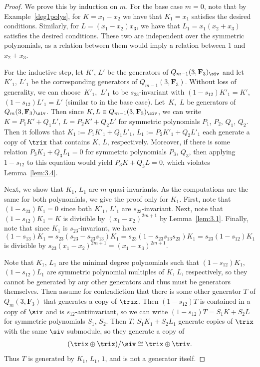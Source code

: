  \begin{proof}
 We prove this by induction on $m$. For the base case $m=0$, note that by Example~\ref{deg1polys}, for ${K=x_1-x_2}$ we have that $K_1=x_1$ satisfies the desired conditions. Similarly, for $L=(x_1-x_2)x_3$, we have that $L_1=x_1(x_2+x_3)$ satisfies the desired conditions. These two are independent over the symmetric polynomials, as a relation between them would imply a relation between 1 and~${x_2+x_3}$.

 For the inductive step, let $K'$, $L'$ be the generators of $Q_{m-1}(3,\mathbf{F}_3)_\siv$ and let $K'_1$, $L'_1$ be the corresponding generators of $Q_{m-1}(3,\mathbf{F}_3)$. Without loss of generality, we can choose~$K'_1$,~$L'_1$ to be $s_{23}$-invariant with $(1-s_{12})K'_1=K'$, $(1-s_{12})L'_1=L'$ (similar to in the base case). Let~$K$,~$L$ be generators of $Q_m(3,\mathbf{F}_3)_\siv$. Then since $K,L\in Q_{m-1}(3,\mathbf{F}_3)_\siv$, we can write $K=P_1K'+Q_1L'$, $L=P_2K'+Q_2L'$ for symmetric polynomials $P_1$, $P_2$, $Q_1$, $Q_2$. Then it follows that $K_1:=P_1K'_1+Q_1L'_1$, $L_1:=P_2K'_1+Q_2L'_1$ each generate a copy of $\trix$ that contains $K$, $L$, respectively. Moreover, if there is some relation $P_3K_1+Q_3L_1=0$ for symmetric polynomials $P_3$, $Q_3$, then applying $1-s_{12}$ to this equation would yield $P_3K+Q_3L=0$, which violates Lemma~\ref{lem:3.4}.

 Next, we show that $K_1$, $L_1$ are $m$-quasi-invariants. As the computations are the same for both polynomials, we give the proof only for $K_1$. First, note that $(1-s_{23})K_1=0$ since both $K'_1$, $L'_1$ are $s_{23}$-invariant. Next, note that $(1-s_{12})K_1=K$ is divisible by $(x_1-x_2)^{2m+1}$ by Lemma~\ref{lem:3.1}. Finally, note that since $K_1$ is $s_{23}$-invariant, we have
 \[(1-s_{13})K_1=s_{23}(s_{23}-s_{23}s_{13})K_1=s_{23}(1-s_{23}s_{13}s_{23})K_1=s_{23}(1-s_{12})K_1\]
 is divisible by $s_{23}(x_1-x_2)^{2m+1}=(x_1-x_3)^{2m+1}$.

 Note that $K_1$, $L_1$ are the minimal degree polynomials such that $(1-s_{12})K_1$, $(1-s_{12})L_1$ are symmetric polynomial multiples of $K$, $L$, respectively, so they cannot be generated by any other generators and thus must be generators themselves. Then assume for contradiction that there is some other generator $T$ of $Q_m(3,\mathbf{F}_3)$ that generates a copy of $\trix$. Then $(1-s_{12})T$ is contained in a copy of $\siv$ and is $s_{12}$-antiinvariant, so we can write $(1-s_{12})T=S_1K+S_2L$ for symmetric polynomials $S_1$, $S_2$. Then $T$,
 $S_1K_1+S_2L_1$ generate copies of $\trix$ with the same $\siv$ submodule, so they generate a copy of
 \[(\trix\oplus\trix)/\siv\cong\trix\oplus\triv. \]
 Thus $T$ is generated by $K_1$, $L_1$, $1$, and is not a generator itself.
 \end{proof}

